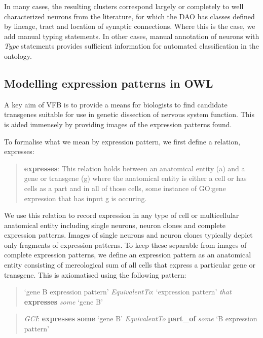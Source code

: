 \documentclass[runningheads,a4paper]{llncs}
\begin{document}
In many cases, the resulting clusters correspond largely or completely
to well characterized neurons from the literature, for which the DAO
has classes defined by lineage, tract and location of synaptic
connections. Where this is the case, we add manual typing
statements. In other cases, manual annotation of neurons with
\textit{Type} statements provides sufficient information for automated
classification in the ontology.

\subsection{Modelling expression patterns in OWL}

A key aim of VFB is to provide a means for biologists to find
candidate transgenes suitable for use in genetic dissection of nervous
system function. This is aided immensely by providing images of the
expression patterns found.

To formalise what we mean by expression pattern, we first define a
relation, expresses:

\begin{quote}
\textbf{expresses}: This relation holds between an anatomical entity (a)
and a gene or transgene (g) where the anatomical entity is either a cell
or has cells as a part and in all of those cells, some instance of GO:gene
expression that has input g is occuring.
\end{quote}


We use this relation to record expression in any type of cell or
multicellular anatomical entity including single neurons, neuron
clones and complete expression patterns.  Images of single neurons and
neuron clones typically depict only fragments of expression patterns.  To keep these
separable from images of complete expression patterns, we define an
expression pattern as an anatomical entity consisting of mereological
sum of all cells that express a particular gene or
transgene.  This is axiomatised using the following pattern:

\begin{quote}
`gene B expression pattern'
\textit{EquivalentTo}: `expression pattern' \textit{that} \textbf{expresses} \textit{some} `gene
B'\end{quote}
\begin{quote} \textit{GCI}: \textbf{expresses} \textbf{some} `gene B' \textit{EquivalentTo}
\textbf{part\_of} \textit{some} `B expression pattern'
\end{quote}
\end{document}
